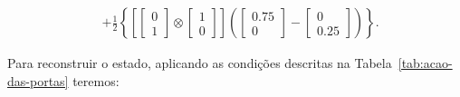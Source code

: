 \begin{equation}
\begin{split}
                &+\frac{1}{2} \left\{ \left[ \begin{bmatrix} 0 \\ 1 \end{bmatrix} \otimes
                  \begin{bmatrix} 1 \\ 0 \end{bmatrix}\right] \left( \begin{bmatrix} \num{0.75} \\ 0 \end{bmatrix} -
                  \begin{bmatrix} 0 \\ \num{0.25} \end{bmatrix}\right) \right\}.
  \end{split}
\end{equation}

Para reconstruir o estado, aplicando as condições descritas na Tabela~\ref{tab:acao-das-portas} teremos:

